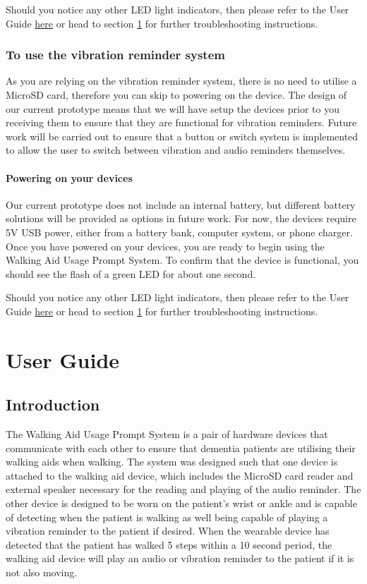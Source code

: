 				Should you notice any other LED light indicators, then please refer to the User Guide \hyperref[sec:user_guide]{here} or head to section \ref{sec:user_guide} for further troubleshooting instructions.

				\subsubsection{To use the vibration reminder system}

				As you are relying on the vibration reminder system, there is no need to utilise a MicroSD card, therefore you can skip to powering on the device. The design of our current prototype means that we will have setup the devices prior to you receiving them to ensure that they are functional for vibration reminders. Future work will be carried out to ensure that a button or switch system is implemented to allow the user to switch between vibration and audio reminders themselves.

				\paragraph{Powering on your devices}\mbox{}

				Our current prototype does not include an internal battery, but different battery solutions will be provided as options in future work. For now, the devices require 5V USB power, either from a battery bank, computer system, or phone charger. Once you have powered on your devices, you are ready to begin using the Walking Aid Usage Prompt System. To confirm that the device is functional, you should see the flash of a green LED for about one second.

				Should you notice any other LED light indicators, then please refer to the User Guide \hyperref[sec:user_guide]{here} or head to section \ref{sec:user_guide} for further troubleshooting instructions.

	\newpage
	\section{User Guide}
	\label{sec:user_guide}

		\subsection{Introduction}

			The Walking Aid Usage Prompt System is a pair of hardware devices that communicate with each other to ensure that dementia patients are utilising their walking aids when walking. The system was designed such that one device is attached to the walking aid device, which includes the MicroSD card reader and external speaker necessary for the reading and playing of the audio reminder. The other device is designed to be worn on the patient's wrist or ankle and is capable of detecting when the patient is walking as well being capable of playing a vibration reminder to the patient if desired. When the wearable device has detected that the patient has walked 5 steps within a 10 second period, the walking aid device will play an audio or vibration reminder to the patient if it is not also moving. 

